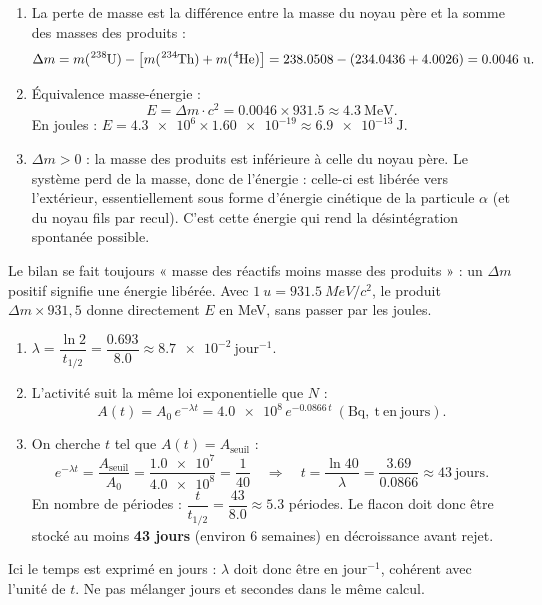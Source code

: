 \documentclass[11pt]{article}
\newcommand{\cle}[1]{{\popxbold\color{popdark}#1}}
\begin{document}
\begin{corrige}
\begin{enumerate}
\item La perte de masse est la différence entre la masse du noyau père et la somme des masses des produits :
\[ \Delta m = m(\ce{^{238}U}) - \left[ m(\ce{^{234}Th}) + m(\ce{^{4}He}) \right] = \num{238,0508} - (\num{234,0436} + \num{4,0026}) = \num{0,0046}\ \mathrm{u}. \]
\item Équivalence masse-énergie :
\[ E = \Delta m \cdot c^{2} = \num{0,0046} \times \num{931,5} \approx \num{4,3}\ \mathrm{MeV}. \]
En joules : $E = \num{4,3e6} \times \num{1,60e-19} \approx \num{6,9e-13}\ \mathrm{J}$.
\item $\Delta m > 0$ : la masse des produits est inférieure à celle du noyau père. Le système perd de la masse, donc de l'énergie : celle-ci est \cle{libérée} vers l'extérieur, essentiellement sous forme d'énergie cinétique de la particule $\alpha$ (et du noyau fils par recul). C'est cette énergie qui rend la désintégration spontanée possible.
\end{enumerate}
\end{corrige}
\begin{attention}
Le bilan se fait toujours « masse des réactifs moins masse des produits » : un $\Delta m$ positif signifie une énergie libérée. Avec $\SI{1}{u} = \SI{931,5}{MeV/c^{2}}$, le produit $\Delta m \times 931,5$ donne directement $E$ en MeV, sans passer par les joules.
\end{attention}

\begin{corrige}
\begin{enumerate}
\item $\lambda = \dfrac{\ln 2}{t_{1/2}} = \dfrac{\num{0,693}}{\num{8,0}} \approx \num{8,7e-2}\ \mathrm{jour^{-1}}$.
\item L'activité suit la même loi exponentielle que $N$ :
\[ A(t) = A_0\,e^{-\lambda t} = \num{4,0e8}\,e^{-\num{0,0866}\,t}\ \mathrm{(Bq,\ t\ en\ jours)}. \]
\item On cherche $t$ tel que $A(t) = A_{\mathrm{seuil}}$ :
\[ e^{-\lambda t} = \frac{A_{\mathrm{seuil}}}{A_0} = \frac{\num{1,0e7}}{\num{4,0e8}} = \frac{1}{40} \quad\Longrightarrow\quad t = \frac{\ln 40}{\lambda} = \frac{\num{3,69}}{\num{0,0866}} \approx \num{43}\ \mathrm{jours}. \]
En nombre de périodes : $\dfrac{t}{t_{1/2}} = \dfrac{\num{43}}{\num{8,0}} \approx \num{5,3}$ périodes. Le flacon doit donc être stocké au moins \textbf{43 jours} (environ 6 semaines) en décroissance avant rejet.
\end{enumerate}
\end{corrige}
\begin{attention}
Ici le temps est exprimé en jours : $\lambda$ doit donc être en $\mathrm{jour^{-1}}$, cohérent avec l'unité de $t$. Ne pas mélanger jours et secondes dans le même calcul.
\end{attention}
\end{document}
